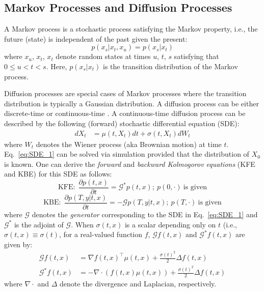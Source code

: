 
\subsection{Markov Processes and Diffusion Processes}

A Markov process is a stochastic process satisfying the Markov property,
i.e., the future (state) is independent of the past given the present:
\[
p\left(x_{s}|x_{t},x_{u}\right)=p\left(x_{s}|x_{t}\right)
\]
where $x_{u}$, $x_{t}$, $x_{t}$ denote random states at times $u$,
$t$, $s$ satisfying that $0\leq u<t<s$. Here, $p\left(x_{s}|x_{t}\right)$
is the transition distribution of the Markov process. 

Diffusion processes are special cases of Markov processes where the
transition distribution is typically a Gaussian distribution. A diffusion
process can be either discrete-time \cite{ho2020denoising} or continuous-time
\cite{song2020score}. A continuous-time diffusion process can be
described by the following (forward) stochastic differential equation
(SDE):
\begin{align}
dX_{t} & =\mu\left(t,X_{t}\right)dt+\sigma\left(t,X_{t}\right)dW_{t}\label{eq:SDE_1}
\end{align}
where $W_{t}$ denotes the Wiener process (aka Brownian motion) at
time $t$. Eq.~\ref{eq:SDE_1} can be solved via simulation provided
that the distribution of $X_{0}$ is known. One can derive the \emph{forward}
and \emph{backward Kolmogorov equations} (KFE and KBE) for this SDE
as follows:
\begin{equation}
\text{KFE:}\ \ \frac{\partial p\left(t,x\right)}{\partial t}=\mathcal{G}^{*}p\left(t,x\right);\ p\left(0,\cdot\right)\ \text{is given}\label{eq:KFE_1}
\end{equation}
\begin{equation}
\text{KBE:}\ \ \frac{\partial p\left(T,y|t,x\right)}{\partial t}=-\mathcal{G}p\left(T,y|t,x\right);\ p\left(T,\cdot\right)\ \text{is given}\label{eq:KBE_1}
\end{equation}
where $\mathtt{\mathcal{G}}$ denotes the \emph{generator} corresponding
to the SDE in Eq.~\ref{eq:SDE_1} and $\mathcal{G}^{*}$ is the adjoint
of $\mathtt{\mathcal{G}}$. When $\sigma\left(t,x\right)$ is a scalar
depending only on $t$ (i.e., $\sigma\left(t,x\right)\equiv\sigma\left(t\right)$,
for a real-valued function $f$, $\mathcal{G}f\left(t,x\right)$ and
$\mathcal{G}^{*}f\left(t,x\right)$ are given by:
\begin{align*}
\mathcal{G}f\left(t,x\right) & ={\nabla f\left(t,x\right)}^{\top}\mu\left(t,x\right)+\frac{{\sigma\left(t\right)}^{2}}{2}\Delta f\left(t,x\right)\\
\mathcal{G}^{*}f\left(t,x\right) & =-\nabla\cdot\left(f\left(t,x\right)\mu\left(t,x\right)\right)+\frac{{\sigma\left(t\right)}^{2}}{2}\Delta f\left(t,x\right)
\end{align*}
where $\nabla\cdot$ and $\Delta$ denote the divergence and Laplacian,
respectively.


